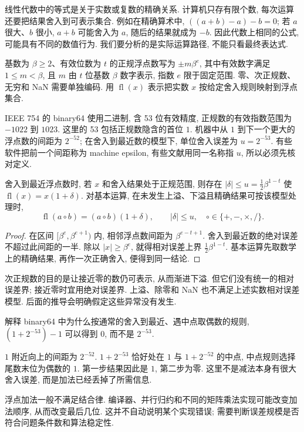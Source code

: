 \label{ch:float}
线性代数中的等式是关于实数或复数的精确关系. 计算机只存有限个数, 每次运算还要把结果舍入到可表示集合. 例如在精确算术中, $((a+b)-a)-b=0$; 若 $a$ 很大、$b$ 很小, $a+b$ 可能舍入为 $a$, 随后的结果就成为 $-b$. 因此代数上相同的公式, 可能具有不同的数值行为. 我们要分析的是实际运算路径, 不能只看最终表达式.

\begin{definition}
基数为 $\beta\ge2$、有效位数为 $t$ 的正规浮点数写为 $\pm m\beta^e$, 其中有效数字满足 $1\le m<\beta$, 且 $m$ 由 $t$ 位基数 $\beta$ 数字表示, 指数 $e$ 限于固定范围. 零、次正规数、无穷和 NaN 需要单独编码. 用 $\operatorname{fl}(x)$ 表示把实数 $x$ 按给定舍入规则映射到浮点集合.
\end{definition}
IEEE 754 的 binary64 使用二进制, 含 53 位有效精度, 正规数的有效指数范围为 $-1022$ 到 $1023$. 这里的 53 包括正规数隐含的首位 $1$. 机器中从 $1$ 到下一个更大的浮点数的间距为 $2^{-52}$; 在舍入到最近数的模型下, 单位舍入误差为 $u=2^{-53}$. 有些软件把前一个间距称为 machine epsilon, 有些文献用同一名称指 $u$, 所以必须先核对定义.

\begin{proposition}\label{prop:rounding}
舍入到最近浮点数时, 若 $x$ 和舍入结果处于正规范围, 则存在 $|\delta|\le u=\tfrac12\beta^{1-t}$ 使 $\operatorname{fl}(x)=x(1+\delta)$. 对基本运算, 在未发生上溢、下溢且精确结果可按该模型处理时,
\[
\operatorname{fl}(a\mathbin{\circ}b)=(a\mathbin{\circ}b)(1+\delta),\qquad |\delta|\le u,
\quad \circ\in\{+,-,\times,/\}.
\]
\end{proposition}
\begin{proof}
在区间 $[\beta^e,\beta^{e+1})$ 内, 相邻浮点数间距为 $\beta^{e-t+1}$. 舍入到最近数的绝对误差不超过此间距的一半. 除以 $|x|\ge\beta^e$, 就得相对误差上界 $\tfrac12\beta^{1-t}$. 基本运算先取数学上的精确结果, 再作一次正确舍入, 便得到同一结论.
\end{proof}
次正规数的目的是让接近零的数仍可表示, 从而渐进下溢. 但它们没有统一的相对误差界; 接近零时宜用绝对误差界. 上溢、除零和 NaN 也不满足上述实数相对误差模型. 后面的推导会明确假定这些异常没有发生.

\begin{example}
解释 binary64 中为什么按通常的舍入到最近、遇中点取偶数的规则, $(1+2^{-53})-1$ 可以得到 $0$, 而不是 $2^{-53}$.
\end{example}
\begin{solution}
$1$ 附近向上的间距为 $2^{-52}$. $1+2^{-53}$ 恰好处在 $1$ 与 $1+2^{-52}$ 的中点, 中点规则选择尾数末位为偶数的 $1$. 第一步结果因此是 $1$, 第二步为零. 这里不是减法本身有很大舍入误差, 而是加法已经丢掉了所需信息.
\end{solution}
浮点加法一般不满足结合律. 编译器、并行归约和不同的矩阵乘法实现可能改变加法顺序, 从而改变最后几位. 这并不自动说明某个实现错误; 需要判断误差规模是否符合问题条件数和算法稳定性.

